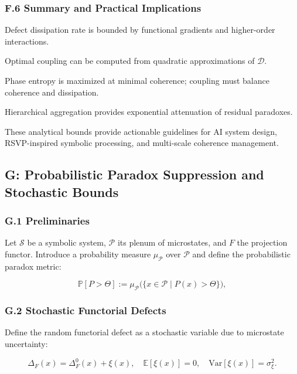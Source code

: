 \documentclass[12pt]{article}
\theoremstyle{plain}
\begin{document}
\subsubsection*{F.6 Summary and Practical Implications}

Defect dissipation rate is bounded by functional gradients and higher-order interactions.

Optimal coupling can be computed from quadratic approximations of \(\mathcal{D}\).

Phase entropy is maximized at minimal coherence; coupling must balance coherence and dissipation.

Hierarchical aggregation provides exponential attenuation of residual paradoxes.

These analytical bounds provide actionable guidelines for AI system design, RSVP-inspired symbolic processing, and multi-scale coherence management.

\subsection*{G: Probabilistic Paradox Suppression and Stochastic Bounds}

\subsubsection*{G.1 Preliminaries}

Let \(\mathcal{S}\) be a symbolic system, \(\mathcal{P}\) its plenum of microstates, and \(F\) the projection functor. Introduce a probability measure \(\mu_\mathcal{P}\) over \(\mathcal{P}\) and define the probabilistic paradox metric:

\begin{equation}
\mathbb{P}[P > \Theta] := \mu_\mathcal{P}\big(\{ x \in \mathcal{P} \mid P(x) > \Theta \}\big),
\end{equation}

\subsubsection*{G.2 Stochastic Functorial Defects}

Define the random functorial defect as a stochastic variable due to microstate uncertainty:

\begin{equation}
\Delta_F(x) = \Delta_F^0(x) + \xi(x), \quad \mathbb{E}[\xi(x)] = 0, \quad \mathrm{Var}[\xi(x)] = \sigma_\xi^2.
\end{equation}
\end{document}

